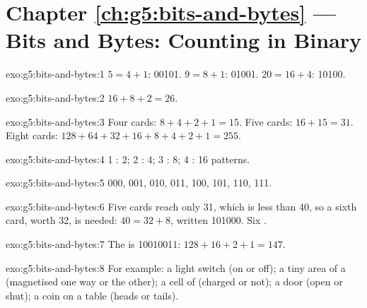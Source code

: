 \section*{Chapter \ref{ch:g5:bits-and-bytes} --- Bits and Bytes: Counting in Binary}

\begin{solution}{exo:g5:bits-and-bytes:1}
$5 = 4 + 1$: 00101. $9 = 8 + 1$: 01001. $20 = 16 + 4$: 10100.
\end{solution}

\begin{solution}{exo:g5:bits-and-bytes:2}
$16 + 8 + 2 = 26$.
\end{solution}

\begin{solution}{exo:g5:bits-and-bytes:3}
Four cards: $8 + 4 + 2 + 1 = 15$. Five cards: $16 + 15 = 31$. Eight cards:
$128 + 64 + 32 + 16 + 8 + 4 + 2 + 1 = 255$.
\end{solution}

\begin{solution}{exo:g5:bits-and-bytes:4}
1 : 2; 2 : 4; 3 : 8; 4 : 16 patterns.
\end{solution}

\begin{solution}{exo:g5:bits-and-bytes:5}
000, 001, 010, 011, 100, 101, 110, 111.
\end{solution}

\begin{solution}{exo:g5:bits-and-bytes:6}
Five cards reach only 31, which is less than 40, so a sixth card, worth 32, is
needed: $40 = 32 + 8$, written 101000. Six .
\end{solution}

\begin{solution}{exo:g5:bits-and-bytes:7}
The  is 10010011: $128 + 16 + 2 + 1 = 147$.
\end{solution}

\begin{solution}{exo:g5:bits-and-bytes:8}
For example: a light switch (on or off); a tiny area of a  (magnetised
one way or the other); a cell of  (charged or not); a door (open or
shut); a coin on a table (heads or tails).
\end{solution}

